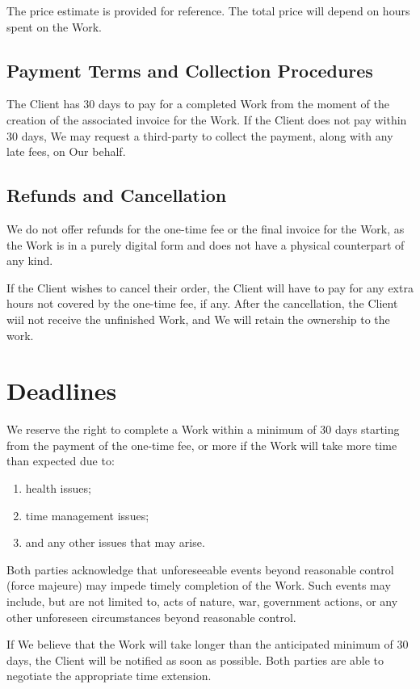 \documentclass{article}
\begin{document}
The price estimate is provided for reference. The total price will depend on hours spent on the Work.

\subsection{Payment Terms and Collection Procedures}
The Client has 30 days to pay for a completed Work from the moment of the creation of the associated invoice for the Work. If the Client does not pay within 30 days, We may request a third-party to collect the payment, along with any late fees, on Our behalf.

\subsection{Refunds and Cancellation}
We do not offer refunds for the one-time fee or the final invoice for the Work, as the Work is in a purely digital form and does not have a physical counterpart of any kind.

If the Client wishes to cancel their order, the Client will have to pay for any extra hours not covered by the one-time fee, if any. After the cancellation, the Client wiil not receive the unfinished Work, and We will retain the ownership to the work.

\newpage

\section{Deadlines}
We reserve the right to complete a Work within a minimum of 30 days starting from the payment of the one-time fee, or more if the Work will take more time than expected due to:
\begin{enumerate}
    \item health issues;
    \item time management issues; %
    \item and any other issues that may arise.
\end{enumerate}
Both parties acknowledge that unforeseeable events beyond reasonable control (force majeure) may impede timely completion of the Work. Such events may include, but are not limited to, acts of nature, war, government actions, or any other unforeseen circumstances beyond reasonable control.

If We believe that the Work will take longer than the anticipated minimum of 30 days, the Client will be notified as soon as possible. Both parties are able to negotiate the appropriate time extension.
\end{document}
